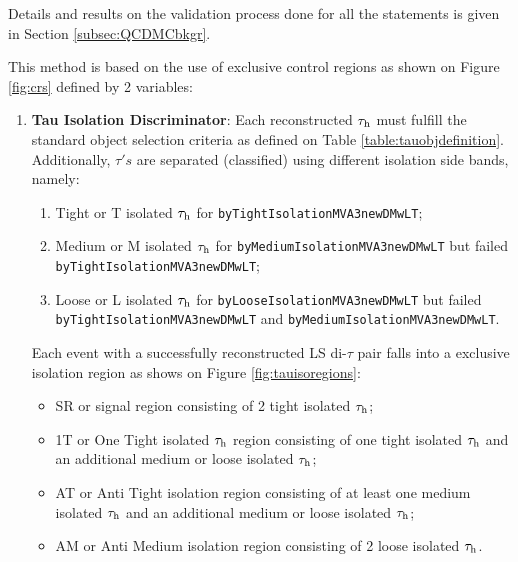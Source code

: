Details and results on the validation process done for all the statements is given in Section \ref{subsec:QCDMCbkgr}.

This method is based on the use of exclusive control regions as shown on Figure \ref{fig:crs} defined by 2 variables:

\begin{enumerate}
\item \textbf{Tau Isolation Discriminator}: Each reconstructed $\tau_{\text{h}}$ must fulfill the standard object selection criteria as defined on Table \ref{table:tauobjdefinition}. Additionally, $\tau's$ are separated (classified) using different isolation side bands, namely:

\begin{enumerate}
\item Tight or T isolated $\tau_{\text{h}}$ for \texttt{byTight\-IsolationMVA3newDMwLT};
\item Medium or M isolated $\tau_{\text{h}}$ for \texttt{byMedium\-IsolationMVA3newDMwLT} but failed \texttt{byTight\-IsolationMVA3newDMwLT};
\item Loose or L isolated $\tau_{\text{h}}$  for \texttt{byLoose\-IsolationMVA3newDMwLT} but failed \texttt{byTight\-IsolationMVA3newDMwLT} and \texttt{byMedium\-IsolationMVA3newDMwLT}.
\end{enumerate}
Each event with a successfully reconstructed LS di-$\tau$ pair falls into a exclusive isolation region as shows on Figure \ref{fig:tauisoregions}:

\begin{itemize}
\item SR or signal region consisting of 2 tight isolated $\tau_{\text{h}}$;
\item 1T or One Tight isolated $\tau_{\text{h}}$ region consisting of one tight isolated $\tau_{\text{h}}$ and an additional medium or loose isolated $\tau_{\text{h}}$;
\item AT or Anti Tight isolation region consisting of at least one medium isolated $\tau_{\text{h}}$ and an additional medium or loose isolated $\tau_{\text{h}}$;
\item AM or Anti Medium isolation region consisting of 2 loose isolated $\tau_{\text{h}}$.
\end{itemize}


\end{enumerate}
